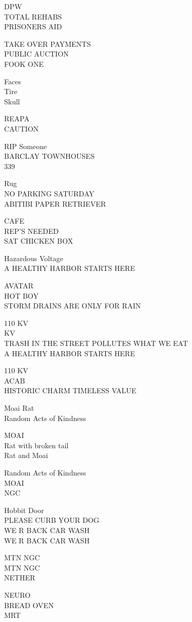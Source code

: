 \documentclass[10pt,letterpaper]{article}
\begin{document}
DPW\\
TOTAL REHABS\\
PRISONERS AID

TAKE OVER PAYMENTS\\
PUBLIC AUCTION\\
FOOK ONE

Faces\\
Tire\\
Skull

REAPA\\
CAUTION

RIP Someone\\
BARCLAY TOWNHOUSES\\
339

Rug\\
NO PARKING SATURDAY\\
ABITIBI PAPER RETRIEVER

CAFE\\
REP'S NEEDED\\
SAT CHICKEN BOX

Hazardous Voltage\\
A HEALTHY HARBOR STARTS HERE

AVATAR\\
HOT BOY\\
STORM DRAINS ARE ONLY FOR RAIN

110 KV\\
KV\\
TRASH IN THE STREET POLLUTES WHAT WE EAT\\
A HEALTHY HARBOR STARTS HERE

110 KV\\
ACAB\\
HISTORIC CHARM TIMELESS VALUE

Moai Rat\\
Random Acts of Kindness

MOAI\\
Rat with broken tail\\
Rat and Moai

Random Acts of Kindness\\
MOAI\\
NGC

Hobbit Door\\
PLEASE CURB YOUR DOG\\
WE R BACK CAR WASH\\
WE R BACK CAR WASH

MTN NGC\\
MTN NGC\\
NETHER

NEURO\\
BREAD OVEN\\
MRT
\end{document}
